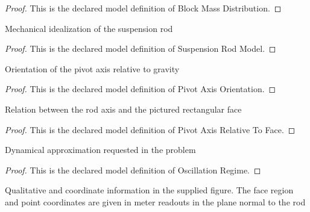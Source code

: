 \begin{proof}
  This is the declared model definition of Block Mass Distribution.
\end{proof}
\begin{definition}
  \label{def:physics:phyx-mini-0265:phyxminiproblems-problemphyxmini0265-suspensionrodmodel}
  Mechanical idealization of the suspension rod
\end{definition}
\begin{proof}
  This is the declared model definition of Suspension Rod Model.
\end{proof}
\begin{definition}
  \label{def:physics:phyx-mini-0265:phyxminiproblems-problemphyxmini0265-pivotaxisorientation}
  Orientation of the pivot axis relative to gravity
\end{definition}
\begin{proof}
  This is the declared model definition of Pivot Axis Orientation.
\end{proof}
\begin{definition}
  \label{def:physics:phyx-mini-0265:phyxminiproblems-problemphyxmini0265-pivotaxisrelativetoface}
  Relation between the rod axis and the pictured rectangular face
\end{definition}
\begin{proof}
  This is the declared model definition of Pivot Axis Relative To Face.
\end{proof}
\begin{definition}
  \label{def:physics:phyx-mini-0265:phyxminiproblems-problemphyxmini0265-oscillationregime}
  Dynamical approximation requested in the problem
\end{definition}
\begin{proof}
  This is the declared model definition of Oscillation Regime.
\end{proof}
\begin{definition}
  \label{def:physics:phyx-mini-0265:phyxminiproblems-problemphyxmini0265-rectangularblockfigure}
  Qualitative and coordinate information in the supplied figure. The face region and point coordinates are given in meter readouts in the plane normal to the rod
\end{definition}
